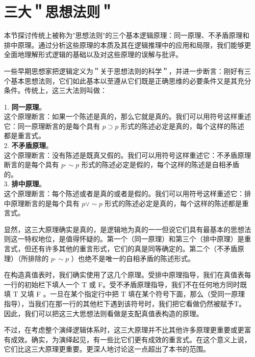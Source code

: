 \section{三大＂思想法则＂}

\begin{logicbox}[title=引言]
本节探讨传统上被称为"思想法则"的三个基本逻辑原理：同一原理、不矛盾原理和排中原理。通过分析这些原理的本质及其在逻辑推理中的应用和局限，我们能够更全面地理解形式逻辑的基础以及对这些原理的误解与批评。
\end{logicbox}

一些早期思想家把逻辑定义为＂关于思想法则的科学＂，并进一步断言：刚好有三个基本思想法则，它们如此基本以至遵从它们既是正确思维的必要条件又是其充分条件。传统上，这三大法则叫做：

1. \textbf{同一原理}。\\
这个原理断言：如果一个陈述是真的，那么它就是真的。我们可以用符号这样重述它：同一原理断言的是每个具有 $p \supset p$ 形式的陈述必定是真的，每个这样的陈述都是重言式。\\

2. \textbf{不矛盾原理}。\\
这个原理断言：没有陈述是既真又假的。我们可以用符号这样重述它：不矛盾原理断言的是每个具有 $p \cdot \sim p$ 形式的陈述必定是假的，每个这样的陈述是自相矛盾的。\\

3. \textbf{排中原理}。\\
这个原理断言：每个陈述或者是真的或者是假的。我们可以用符号这样重述它：排中原理断言的是每个具有 $p \vee \sim p$ 形式的陈述必定是真的，每个这样的陈述都是重言式。

显然，这三大原理确实是真的，是逻辑地为真的一一但说它们具有最基本的思想法则这一特权地位，是值得怀疑的。第一个（同一原理）和第三个（排中原理）是重言式，但还有许多其他的重言形式，它们的真是同等确定的。第二个（不矛盾原理）（所排除的 $p \cdot \sim p$ ）也绝不是唯一的自相矛盾的陈述形式。

在构造真值表时，我们确实使用了这几个原理。受排中原理指导，我们在真值表每一行的初始栏下填人一个 T 或 F。受不矛盾原理指导，我们不在任何地方同时既填 T 又填 F 。一旦在某个指定行中把 T 填在某个符号下面，那么（受同一原理指导），当我们在那一行的其他栏下遇到该符号时，我们把它看做仍然被赋予T。因此，我们可以把这三大思想法则看做是支配真值表构造的原理。

不过，在考虑整个演绎逻辑体系时，这三大原理并不比其他许多原理更重要或更富有成效。确实，为演绎起见，有一些比它们更有成效的重言式。在这个意义上说，它们比这三大原理更重要。更深人地讨论这一点超出了本书的范围。\cite{hamilton1833}


